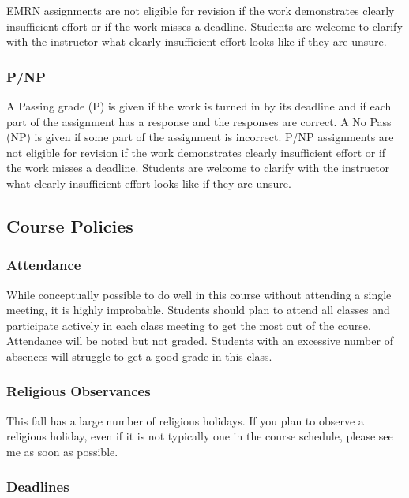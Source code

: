 \documentclass[
  11pt,
]{article}
\begin{document}
EMRN assignments are not eligible for revision if the work demonstrates
clearly insufficient effort or if the work misses a deadline. Students
are welcome to clarify with the instructor what clearly insufficient
effort looks like if they are unsure.

\hypertarget{pnp}{%
\subsubsection{P/NP}\label{pnp}}

A Passing grade (P) is given if the work is turned in by its deadline
and if each part of the assignment has a response and the responses are
correct. A No Pass (NP) is given if some part of the assignment is
incorrect. P/NP assignments are not eligible for revision if the work
demonstrates clearly insufficient effort or if the work misses a
deadline. Students are welcome to clarify with the instructor what
clearly insufficient effort looks like if they are unsure.

\hypertarget{course-policies}{%
\subsection{Course Policies}\label{course-policies}}

\hypertarget{attendance}{%
\subsubsection{Attendance}\label{attendance}}

While conceptually possible to do well in this course without attending
a single meeting, it is highly improbable. Students should plan to
attend all classes and participate actively in each class meeting to get
the most out of the course. Attendance will be noted but not graded.
Students with an excessive number of absences will struggle to get a
good grade in this class.

\hypertarget{religious-observances}{%
\subsubsection{Religious Observances}\label{religious-observances}}

This fall has a large number of religious holidays. If you plan to
observe a religious holiday, even if it is not typically one in the
course schedule, please see me as soon as possible.

\hypertarget{deadlines}{%
\subsubsection{Deadlines}\label{deadlines}}
\end{document}
